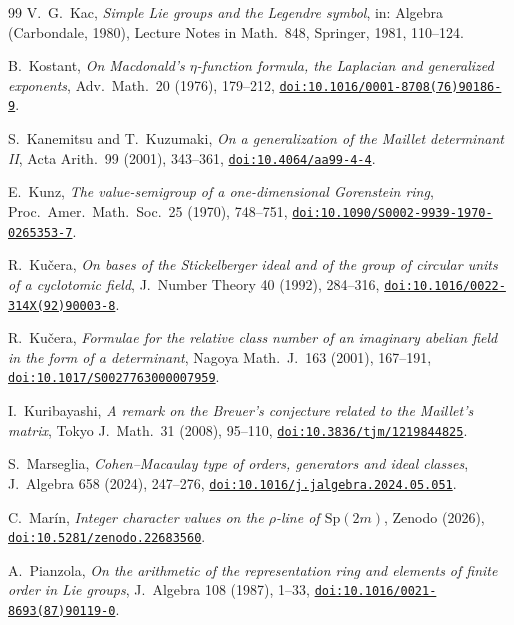 \documentclass[11pt,a4paper]{article}
\theoremstyle{definition}
\newcommand{\Sp}{\mathrm{Sp}}
\begin{document}
\begin{thebibliography}{99}
 V.~G.~Kac, \emph{Simple Lie groups and the Legendre symbol}, in: Algebra (Carbondale, 1980), Lecture
Notes in Math.~848, Springer, 1981, 110--124.

 B.~Kostant, \emph{On Macdonald's $\eta$-function formula, the Laplacian and generalized exponents}, Adv.~Math.~20 (1976), 179--212, \href{https://doi.org/10.1016/0001-8708(76)90186-9}{\texttt{doi:10.1016/0001-8708(76)90186-9}}.

 S.~Kanemitsu and T.~Kuzumaki, \emph{On a generalization of the Maillet determinant II}, Acta Arith.~99 (2001), 343--361, \href{https://doi.org/10.4064/aa99-4-4}{\texttt{doi:10.4064/aa99-4-4}}.

 E.~Kunz, \emph{The value-semigroup of a one-dimensional Gorenstein ring}, Proc.~Amer.~Math.~Soc.~25 (1970), 748--751, \href{https://doi.org/10.1090/S0002-9939-1970-0265353-7}{\texttt{doi:10.1090/S0002-9939-1970-0265353-7}}.

 R.~Ku\v{c}era, \emph{On bases of the Stickelberger ideal and of the group of circular units of a
cyclotomic field}, J.~Number Theory 40 (1992), 284--316, \href{https://doi.org/10.1016/0022-314X(92)90003-8}{\texttt{doi:10.1016/0022-314X(92)90003-8}}.

 R.~Ku\v{c}era, \emph{Formulae for the relative class number of an imaginary abelian field in the form of a determinant}, Nagoya Math.~J.~163 (2001), 167--191, \href{https://doi.org/10.1017/S0027763000007959}{\texttt{doi:10.1017/S0027763000007959}}.

 I.~Kuribayashi, \emph{A remark on the Breuer's conjecture related to the Maillet's matrix}, Tokyo J.~Math.~31 (2008), 95--110, \href{https://doi.org/10.3836/tjm/1219844825}{\texttt{doi:10.3836/tjm/1219844825}}.

 S.~Marseglia, \emph{Cohen--Macaulay type of orders, generators and ideal classes}, J.~Algebra 658 (2024), 247--276, \href{https://doi.org/10.1016/j.jalgebra.2024.05.051}{\texttt{doi:10.1016/j.jalgebra.2024.05.051}}.

 C.~Mar\'in, \emph{Integer character values on the $\rho$-line of $\Sp(2m)$}, Zenodo (2026), \href{https://doi.org/10.5281/zenodo.22683560}{\texttt{doi:10.5281/zenodo.22683560}}.

 A.~Pianzola, \emph{On the arithmetic of the representation ring and elements of finite order in Lie
groups}, J.~Algebra 108 (1987), 1--33, \href{https://doi.org/10.1016/0021-8693(87)90119-0}{\texttt{doi:10.1016/0021-8693(87)90119-0}}.


\end{thebibliography}
\end{document}
